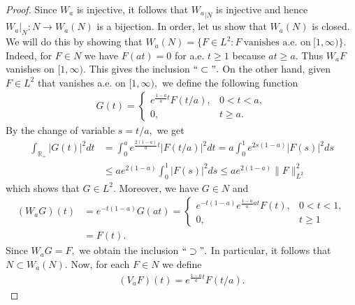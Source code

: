 \documentclass[11pt]{amsart}
\theoremstyle{plain}
\theoremstyle{remark}
\theoremstyle{plain}
\begin{document}
\begin{proof}
Since $W_a$ is injective, it follows that ${W_a}_{|N}$ is injective and hence ${W_a}|_{N}: N \to W_a(N)$ is a bijection. In order, let us show  that $W_a(N)$ is closed. We will do this by showing that $W_a(N)=\{F\in L^2:F\ \text{vanishes a.e. on}\ [1, \infty) \}.$ Indeed,  for $F\in N$ we have $F(at)=0$ for a.e. $t\geq1$ because $at \geq a$. Thus $W_aF$ vanishes on $[1,\infty).$ This gives the inclusion $``\subset".$ On the other hand, given $F\in L^2$ that vanishes a.e. on $[1,\infty),$ we define the following function
\begin{align}\label{surjective}
G(t)=\begin{cases}
e^{\frac{1-a}{a}t}F(t/a), & 0<t<a,\\
0,& t\geq a.
\end{cases}
\end{align}
By the change of variable $s=t/a,$ we get
\begin{align*}
\int_{\mathbb{R}_+}|G(t)|^2dt&=\int_{0}^{a} e^{\frac{2(1-a)}{a}t}|F(t/a)|^2dt = a\int^1_0 e^{2s(1-a)}|F(s)|^2ds\\
&\leq ae^{2(1-a)}\int^1_0|F(s)|^2ds\leq ae^{2(1-a)}\|F\|_{L^2}^2
\end{align*}
which shows that $G\in L^2.$ Moreover, we have $G\in N$ and
\begin{align*}
(W_aG)(t)&=e^{-t(1-a)}G(at)=\begin{cases}
e^{-t(1-a)}e^{\frac{1-a}{a}at}F(t), & 0<t<1,\\
0,& t\geq 1
\end{cases}\\
&=F(t).
\end{align*}
Since $W_aG=F,$ we obtain the inclusion $``\supset ".$ In particular, it follows that $N\subset W_a(N).$ Now, for each $F\in N$ we define
\begin{align*}
(V_aF)(t)=e^{\frac{1-a}{a}t}F(t/a).
\end{align*}




\end{proof}
\end{document}
